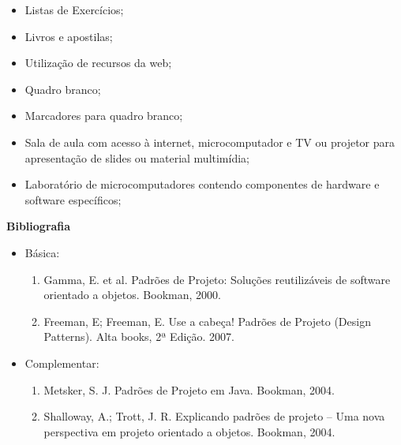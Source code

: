 \begin{itemize} 
  \item Listas de Exercícios;
    \item Livros e apostilas;
    \item Utilização de recursos da web;
    \item Quadro branco;
    \item Marcadores para quadro branco;
    \item Sala de aula com acesso à internet, microcomputador e TV ou projetor para apresentação de slides ou material multimídia;
    \item Laboratório de microcomputadores contendo componentes de hardware e software específicos;
\end{itemize}



\begin{snugshade}\begin{center}\textbf{
    Bibliografia
}\end{center}\end{snugshade}

\begin{itemize} 
  \item Básica:
	\begin{enumerate}
	\item Gamma, E. et al. Padrões de Projeto: Soluções reutilizáveis de software orientado a objetos. Bookman, 2000.
	\item Freeman, E; Freeman, E. Use a cabeça! Padrões de Projeto (Design Patterns). Alta books, 2ª Edição. 2007.      
	\end{enumerate}
  \item Complementar:
	\begin{enumerate} 
	\item Metsker, S. J. Padrões de Projeto em Java. Bookman, 2004.
	\item Shalloway, A.; Trott, J. R. Explicando padrões de projeto – Uma nova perspectiva em projeto orientado a objetos. Bookman, 2004.
	\end{enumerate}
\end{itemize}
